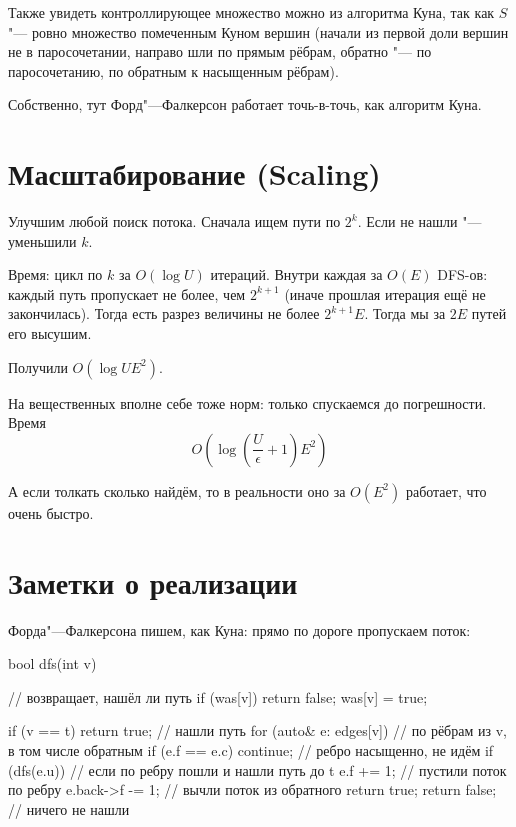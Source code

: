 Также увидеть контроллирующее множество можно из алгоритма Куна, так как $S$ "--- ровно множество помеченным Куном вершин
(начали из первой доли вершин не в паросочетании, направо шли по прямым рёбрам, обратно "--- по паросочетанию, по обратным к насыщенным рёбрам).

Собственно, тут Форд"---Фалкерсон работает точь-в-точь, как алгоритм Куна.

\section{Масштабирование (Scaling)}

Улучшим любой поиск потока. Сначала ищем пути по $2^k$. Если не нашли "--- уменьшили $k$.

Время: цикл по $k$ за $O(\log U)$ итераций.
Внутри каждая за $O(E)$ DFS-ов: каждый путь пропускает не более, чем $2^{k+1}$ (иначе прошлая итерация ещё не закончилась).
Тогда есть разрез величины не более $2^{k+1}E$.
Тогда мы за $2E$ путей его высушим.

Получили $O(\log U E^2)$.

На вещественных вполне себе тоже норм: только спускаемся до погрешности.
Время
\[ O\left(\log \left(\frac{U}{\epsilon}+1\right) E^2\right) \]

А если толкать сколько найдём, то в реальности оно за $O(E^2)$ работает, что очень быстро.

\section{Заметки о реализации}

Форда"---Фалкерсона пишем, как Куна: прямо по дороге пропускаем поток:
\begin{cppcode}
bool dfs(int v) { // возвращает, нашёл ли путь
	if (was[v]) return false;
	was[v] = true;

	if (v == t) return true; // нашли путь
	for (auto& e: edges[v]) { // по рёбрам из v, в том числе обратным
		if (e.f == e.c) continue; // ребро насыщенно, не идём
		if (dfs(e.u)) { // если по ребру пошли и нашли путь до t
			e.f += 1; // пустили поток по ребру
			e.back->f -= 1; // вычли поток из обратного
			return true;
		}
	}
	return false; // ничего не нашли
}
\end{cppcode}
